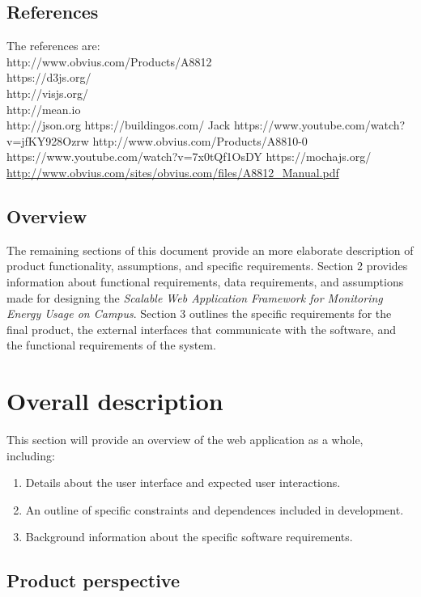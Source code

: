\documentclass[onecolumn, draftclsnofoot,10pt, compsoc]{IEEEtran}
\begin{document}
    \subsection{References} 
	The references are:\\
	http://www.obvius.com/Products/A8812 \\
    https://d3js.org/  \\
    http://visjs.org/  \\
    http://mean.io  \\
	http://json.org
	https://buildingos.com/
	Jack
    https://www.youtube.com/watch?v=jfKY928Ozrw
    http://www.obvius.com/Products/A8810-0
    https://www.youtube.com/watch?v=7x0tQf1OsDY
    https://mochajs.org/
    \url{http://www.obvius.com/sites/obvius.com/files/A8812_Manual.pdf}

    \subsection{Overview}
	The remaining sections of this document provide an more elaborate description of product functionality, assumptions, and specific requirements. Section 2 provides information about functional requirements, data requirements, and assumptions made for designing the \textit{Scalable Web Application Framework for Monitoring Energy Usage on Campus}. Section 3 outlines the specific requirements for the final product, the external interfaces that communicate with the software, and the functional requirements of the system.
	
    \section{Overall description}
    This section will provide an overview of the web application as a whole, including:
        \begin{enumerate} 
            \item Details about the user interface and expected user interactions.
            \item An outline of specific constraints and dependences included in development. 
            \item Background information about the specific software requirements.
        \end{enumerate}
    \subsection{Product perspective}
\end{document}
